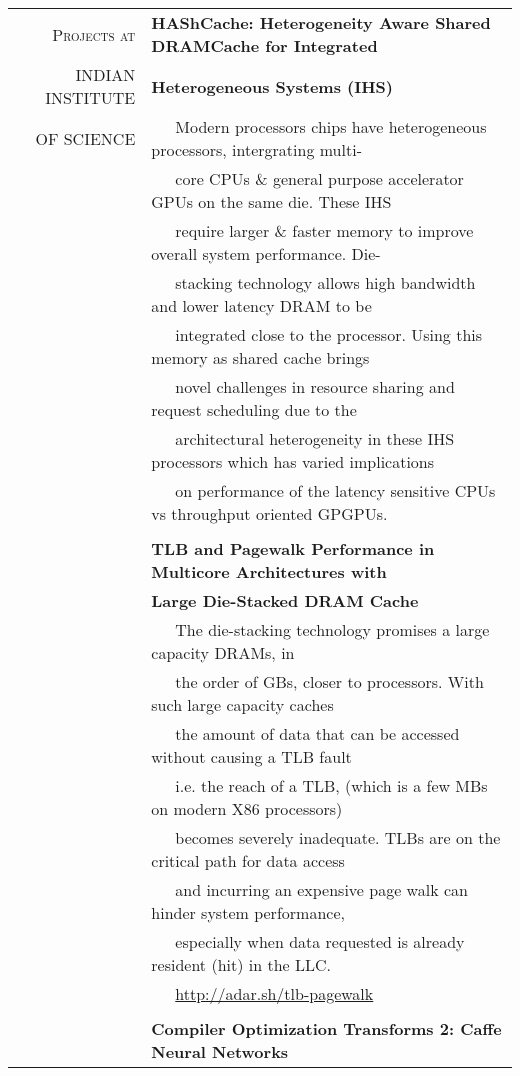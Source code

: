\documentclass[a4paper,10pt]{article} %
\begin{document}
\begin{tabular}{rl}
\textsc{Projects at} & \textbf{HAShCache: Heterogeneity Aware Shared DRAMCache for Integrated } \\
\textsc{INDIAN INSTITUTE} & \textbf{Heterogeneous Systems (IHS) } \\
\textsc{OF SCIENCE} & ~~~Modern processors chips have heterogeneous processors, intergrating multi-\\
& ~~~core CPUs \& general purpose accelerator GPUs on the same die. These IHS\\
& ~~~require larger \& faster memory to improve overall system performance. Die-\\
& ~~~stacking technology allows high bandwidth and lower latency DRAM to be\\
& ~~~integrated close to the processor. Using this memory as shared cache brings\\
& ~~~novel challenges in resource sharing and request scheduling due to the\\
& ~~~architectural heterogeneity in these IHS processors which has varied implications\\
& ~~~on performance of the latency sensitive CPUs vs throughput oriented GPGPUs.\\
& \\
& \textbf{TLB and Pagewalk Performance in Multicore Architectures with} \\
& \textbf{Large Die-Stacked DRAM Cache }\\
& ~~~The die-stacking technology promises a large capacity DRAMs, in\\
& ~~~the order of GBs, closer to processors. With such large capacity caches\\
& ~~~the amount of data that can be accessed without causing a TLB fault\\
& ~~~i.e. the reach of a TLB, (which is a few MBs on modern X86 processors)\\
& ~~~becomes severely inadequate. TLBs are on the critical path for data access\\
& ~~~and incurring an expensive page walk can hinder system performance,\\
& ~~~especially when data requested is already resident (hit) in the LLC.\\
& ~~~\href{http://adar.sh/tlb-pagewalk}{http://adar.sh/tlb-pagewalk}\\
& \\
& \textbf{Compiler Optimization Transforms 2: Caffe Neural Networks}\\

\end{tabular}
\end{document}
